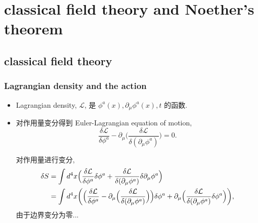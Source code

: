 \chapter{classical field theory and Noether's theorem}
\section{classical field theory}
\subsection{Lagrangian density and the action}
\begin{itemize}
	\item Lagrangian density, $\mathcal{L}$, 是 $\phi^a(x), \partial_\mu \phi^a(x), t$ 的函数.
	
	\item 对作用量变分得到 Euler-Lagrangian equation of motion,
	\begin{equation} \label{D.1.1}
		\frac{\delta \mathcal{L}}{\delta \phi^a} - \partial_\mu \Big( \frac{\delta \mathcal{L}}{\delta (\partial_\mu \phi^a)} \Big) = 0.
	\end{equation}
	
	\begin{tcolorbox}[title=calculation:]
		对作用量进行变分,
		\begin{align}
			\delta S &= \int d^4 x \Big( \frac{\delta \mathcal{L}}{\delta \phi^a} \delta \phi^a + \frac{\delta \mathcal{L}}{\delta (\partial_\mu \phi^a)} \delta \partial_\mu \phi^a \Big) \notag \\
			&= \int d^4 x \bigg( \Big( \frac{\delta \mathcal{L}}{\delta \phi^a} - \partial_\mu \Big( \frac{\delta \mathcal{L}}{\delta (\partial_\mu \phi^a)} \Big) \Big) \delta \phi^a + \partial_\mu \Big( \frac{\delta \mathcal{L}}{\delta (\partial_\mu \phi^a)} \delta \phi^a \Big) \bigg),
		\end{align}
		由于边界变分为零...
	\end{tcolorbox}
\end{itemize}

